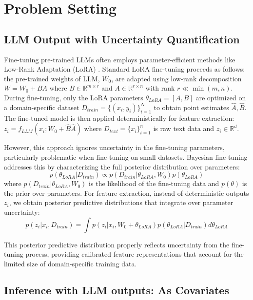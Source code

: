\documentclass[11pt]{article}
\begin{document}
\section{Problem Setting}

\subsection{LLM Output with Uncertainty Quantification}

Fine-tuning pre-trained LLMs often employs parameter-efficient methods like Low-Rank Adaptation (LoRA) \citep{hu2022lora}. Standard LoRA fine-tuning proceeds as follows: the pre-trained weights of LLM, $W_0$, are adapted using low-rank decomposition $W = W_0 + BA$ where $B \in \mathbb{R}^{m \times r}$ and $A \in \mathbb{R}^{r \times n}$ with rank $r \ll \min(m, n)$. During fine-tuning, only the LoRA parameters $\theta_{LoRA} = [A, B]$ are optimized on a domain-specific dataset $D_{train} = \{(x_i, y_i)\}_{i=1}^N$ to obtain point estimates $\hat{A}, \hat{B}$. The fine-tuned model is then applied deterministically for feature extraction: $z_i = f_{LLM}(x_i; W_0 + \hat{B}\hat{A})$ where $D_{text} = \{x_i\}_{i=1}^n$ is raw text data and $z_i \in \mathbb{R}^d$.

However, this approach ignores uncertainty in the fine-tuning parameters, particularly problematic when fine-tuning on small datasets. Bayesian fine-tuning \citep{yang2023bayesian, wang2024blob} addresses this by characterizing the full posterior distribution over parameters:
\begin{equation}
p(\theta_{LoRA}|D_{train}) \propto p(D_{train}|\theta_{LoRA}, W_0)p(\theta_{LoRA})
\end{equation}
where $p(D_{train}|\theta_{LoRA}, W_0)$ is the likelihood of the fine-tuning data and $p(\theta)$ is the prior over parameters. For feature extraction, instead of deterministic outputs $z_i$, we obtain posterior predictive distributions that integrate over parameter uncertainty:
\begin{equation}
p(z_i|x_i, D_{train}) = \int p(z_i|x_i, W_0 + \theta_{LoRA})p(\theta_{LoRA}|D_{train})d\theta_{LoRA}
\end{equation}

This posterior predictive distribution properly reflects uncertainty from the fine-tuning process, providing calibrated feature representations that account for the limited size of domain-specific training data.

\subsection{Inference with LLM outputs: As Covariates}
\end{document}
